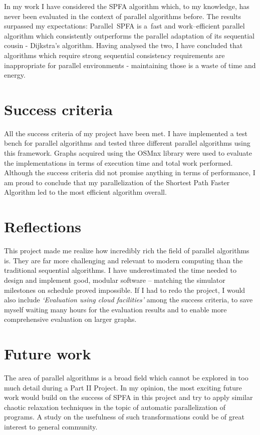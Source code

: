 \documentclass[12pt,a4paper,oneside,openright]{report}
\begin{document}
In my work I have considered the SPFA algorithm which, to my knowledge, has never been evaluated in the context of parallel algorithms before. The results surpassed my expectations: Parallel~SPFA is a~fast and work--efficient parallel algorithm which consistently outperforms the parallel adaptation of its sequential cousin - Dijkstra's algorithm. Having analysed the two, I have concluded that algorithms which require strong sequential consistency requirements are inappropriate for parallel environments - maintaining those is a waste of time and energy.

\section{Success criteria}
All the success criteria of my project have been met. I have implemented a test bench for parallel algorithms and tested three different parallel algorithms using this framework. Graphs acquired using the OSMnx library were used to evaluate the implementations in terms of execution time and total work performed. Although the success criteria did not promise anything in terms of performance, I am proud to conclude that my parallelization of the Shortest Path Faster Algorithm led to the most efficient algorithm overall.

\section{Reflections}
This project made me realize how incredibly rich the field of parallel algorithms is. They are far more challenging and relevant to modern computing than the traditional sequential algorithms. I have underestimated the time needed to design and implement good, modular software -- matching the simulator milestones on schedule proved impossible. If I had to redo the project, I would also include \textit{`Evaluation using cloud facilities'} among the success criteria, to save myself waiting many hours for the evaluation results and to enable more comprehensive evaluation on larger graphs.

\section{Future work}
The area of parallel algorithms is a broad field which cannot be explored in too much detail during a Part II Project. In my opinion, the most exciting future work would build on the success of SPFA in this project and try to apply similar chaotic relaxation techniques in the topic of automatic parallelization of programs. A study on the usefulness of such transformations could be of great interest to general community. 
\end{document}
